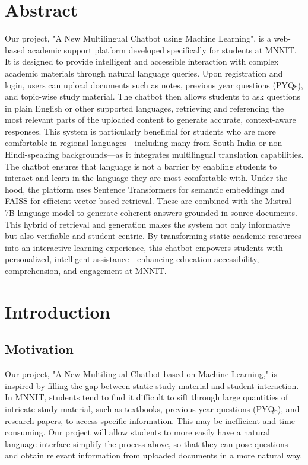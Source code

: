 \documentclass[12pt]{report}
\begin{document}
\chapter*{Abstract}
Our project, "A New Multilingual Chatbot using Machine Learning", is a web-based academic support platform developed specifically for students at MNNIT. It is designed to provide intelligent and accessible interaction with complex academic materials through natural language queries. Upon registration and login, users can upload documents such as notes, previous year questions (PYQs), and topic-wise study material. The chatbot then allows students to ask questions in plain English or other supported languages, retrieving and referencing the most relevant parts of the uploaded content to generate accurate, context-aware responses.
\newline
\vspace{1cm}
This system is particularly beneficial for students who are more comfortable in regional languages—including many from South India or non-Hindi-speaking backgrounds—as it integrates multilingual translation capabilities. The chatbot ensures that language is not a barrier by enabling students to interact and learn in the language they are most comfortable with.
\vspace{1cm}
Under the hood, the platform uses Sentence Transformers for semantic embeddings and FAISS for efficient vector-based retrieval. These are combined with the Mistral 7B language model to generate coherent answers grounded in source documents. This hybrid of retrieval and generation makes the system not only informative but also verifiable and student-centric.
By transforming static academic resources into an interactive learning experience, this chatbot empowers students with personalized, intelligent assistance—enhancing education accessibility, comprehension, and engagement at MNNIT.

\tableofcontents
\newpage



\chapter{Introduction}

\section{Motivation}
Our project, "A New Multilingual Chatbot based on Machine Learning," is inspired by filling the gap between static study material and student interaction. In MNNIT, students tend to find it difficult to sift through large quantities of intricate study material, such as textbooks, previous year questions (PYQs), and research papers, to access specific information. This may be inefficient and time-consuming. Our project will allow students to more easily have a natural language interface simplify the process above, so that they can pose questions and obtain relevant information from uploaded documents in a more natural way.
\end{document}
